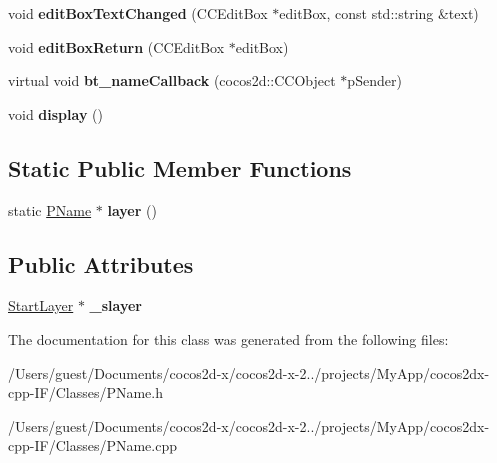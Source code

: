 \begin{DoxyCompactItemize}
\item 
\hypertarget{class_p_name_a1d401ec89f7b75e8ef325581927d468c}{void {\bfseries edit\-Box\-Text\-Changed} (C\-C\-Edit\-Box $\ast$edit\-Box, const std\-::string \&text)}\label{class_p_name_a1d401ec89f7b75e8ef325581927d468c}

\item 
\hypertarget{class_p_name_a84499985b8398dbbc8329c258db8561c}{void {\bfseries edit\-Box\-Return} (C\-C\-Edit\-Box $\ast$edit\-Box)}\label{class_p_name_a84499985b8398dbbc8329c258db8561c}

\item 
\hypertarget{class_p_name_aa166c3ebc5628baa6af470fda1096e64}{virtual void {\bfseries bt\-\_\-name\-Callback} (cocos2d\-::\-C\-C\-Object $\ast$p\-Sender)}\label{class_p_name_aa166c3ebc5628baa6af470fda1096e64}

\item 
\hypertarget{class_p_name_ae3bf1348c213608d2b686a1ea2cf722c}{void {\bfseries display} ()}\label{class_p_name_ae3bf1348c213608d2b686a1ea2cf722c}

\end{DoxyCompactItemize}
\subsection*{Static Public Member Functions}
\begin{DoxyCompactItemize}
\item 
\hypertarget{class_p_name_a4a27e2691f1bf1b72691ac1153dedda3}{static \hyperlink{class_p_name}{P\-Name} $\ast$ {\bfseries layer} ()}\label{class_p_name_a4a27e2691f1bf1b72691ac1153dedda3}

\end{DoxyCompactItemize}
\subsection*{Public Attributes}
\begin{DoxyCompactItemize}
\item 
\hypertarget{class_p_name_a9de11c3cf148c5208946cb788d1815cf}{\hyperlink{class_start_layer}{Start\-Layer} $\ast$ {\bfseries \-\_\-slayer}}\label{class_p_name_a9de11c3cf148c5208946cb788d1815cf}

\end{DoxyCompactItemize}


The documentation for this class was generated from the following files\-:\begin{DoxyCompactItemize}
\item 
/\-Users/guest/\-Documents/cocos2d-\/x/cocos2d-\/x-\/2../projects/\-My\-App/cocos2dx-\/cpp-\/\-I\-F/\-Classes/P\-Name.\-h\item 
/\-Users/guest/\-Documents/cocos2d-\/x/cocos2d-\/x-\/2../projects/\-My\-App/cocos2dx-\/cpp-\/\-I\-F/\-Classes/P\-Name.\-cpp\end{DoxyCompactItemize}
